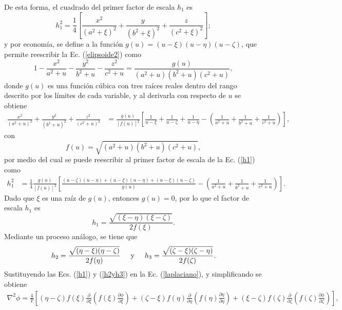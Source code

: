 De esta forma, el cuadrado del primer factor de escala $h_1$ es
\begin{equation}
	h_1^2=\frac{1}{4}\left[\frac{x^2}{(a^2+\xi)^2}+\frac{y}{(b^2+\xi)^2}+\frac{z}{(c^2+\xi)^2}\right];
	\label{h1}
\end{equation}
y por economía, se define a la función $g(u)=(u-\xi)(u-\eta)(u-\zeta)$, que permite reescribir la Ec. (\ref{elipsoide2}) como
\begin{equation}
	1-\frac{x^2}{a^2+u}-\frac{y^2}{b^2+u}-\frac{z^2}{c^2+u}=\frac{g(u)}{(a^2+u)(b^2+u)(c^2+u)},
\end{equation}
donde $g(u)$ es una función cúbica con tres raíces reales dentro del rango descrito por los límites de cada variable, y al  derivarla con respecto de $u$ se obtiene
\begin{align}
	\frac{x^2}{(a^2+u)^2}+\frac{y^2}{(b^2+u)^2}+\frac{z^2}{(c^2+u)^2}&=\frac{g(u)}{[f(u)]^2}\left[\frac{1}{u-\xi}+\frac{1}{u-\zeta}+\frac{1}{u-\eta}-\left(\frac{1}{a^2+u}+\frac{1}{b^2+u}+\frac{1}{c^2+u}\right)\right],
\end{align}
con 
\begin{equation}
	f(u)=\sqrt{(a^2+u)(b^2+u)(c^2+u)},  
\end{equation}
por medio del cual se puede reescribir al primer factor de escala de la Ec. (\ref{h1}) como
\begin{align*}
	h_1^2&=\frac{1}{4}\frac{g(u)}{[f(u)]^2}\left[\frac{(u-\zeta)(u-\eta)+(u-\xi)(u-\eta)+(u-\xi)(u-\zeta)}{g(u)}-\left(\frac{1}{a^2+u}+\frac{1}{b^2+u}+\frac{1}{c^2+u}\right)\right].    
\end{align*}
Dado que $\xi$ es una raíz de $g(u)$, entonces $g(u)=0$, por lo que el factor de escala $h_1$ es
\begin{equation}
	h_1=\frac{\sqrt{(\xi-\eta)(\xi-\zeta)}}{2f(\xi)}.
	\label{h1_1}
\end{equation}
Mediante un proceso análogo, se tiene que \cite{Arfken}
\begin{equation}
	h_2=\frac{\sqrt{(\eta-\xi)(\eta-\zeta)}}{2f(\eta)}\hspace{0.5cm}\mbox{y}\hspace{0.5cm}
	h_3=\frac{\sqrt{(\zeta-\xi)(\zeta-\eta)}}{2f(\zeta)}.
	\label{h2yh3}
\end{equation}
Sustituyendo las Ecs. (\ref{h1}) y (\ref{h2yh3}) en la Ec. (\ref{laplaciano}), y simplificando se obtiene
\begin{align*}
	\nabla^2\phi=\frac{4}{\Upsilon}\left[(\eta-\zeta)f(\xi)\frac{\partial}{\partial\xi}\left(f(\xi)\frac{\partial\phi}{\partial\xi}\right)+(\zeta-\xi)f(\eta)\frac{\partial}{\partial\eta}\left(f(\eta)\frac{\partial\eta}{\partial\eta}\right)+(\xi-\zeta)f(\zeta)\frac{\partial}{\partial\zeta}\left(f(\zeta)\frac{\partial\phi}{\partial\zeta}\right)\right],
\end{align*}
